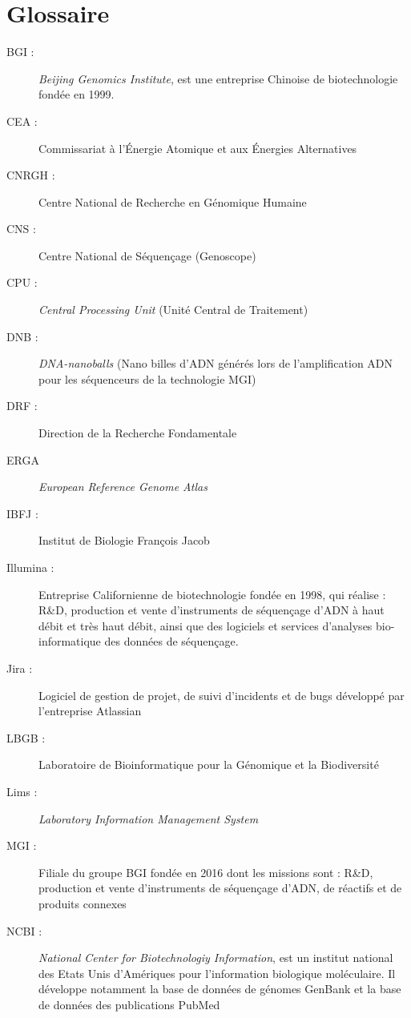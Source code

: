 \section*{Glossaire}

\begin{description}
    \item[BGI : ] \emph{Beijing Genomics Institute}, est une entreprise Chinoise de biotechnologie fondée en 1999.
    \item[CEA :] Commissariat à l'Énergie Atomique et aux Énergies Alternatives
    \item[CNRGH :] Centre National de Recherche en Génomique Humaine 
    \item[CNS :] Centre National de Séquençage (Genoscope)
    \item[CPU :] \emph{Central Processing Unit} (Unité Central de Traitement)
    \item[DNB :] \emph{DNA-nanoballs} (Nano \og billes\fg{} d'ADN générés lors de l'amplification ADN pour les séquenceurs de la technologie MGI)
    \item[DRF :] Direction de la Recherche Fondamentale
    \item[ERGA] \emph{European Reference Genome Atlas}
    \item[IBFJ :] Institut de Biologie François Jacob
    \item[Illumina :] Entreprise Californienne de biotechnologie fondée en 1998, qui réalise : R\&D, production et vente d’instruments de séquençage d’ADN à haut débit et très haut débit, ainsi que des logiciels et services d'analyses bio-informatique des données de séquençage.
    \item[Jira :] Logiciel de gestion de projet, de suivi d'incidents et de bugs développé par l'entreprise Atlassian
    \item[LBGB :] Laboratoire de Bioinformatique pour la Génomique et la Biodiversité
    \item[Lims :] \emph{Laboratory Information Management System}
    \item[MGI : ] Filiale du groupe BGI fondée en 2016 dont les missions sont : R\&D, production et vente d’instruments de séquençage 
    d’ADN, de réactifs et de produits connexes
    \item[NCBI :] \emph{National Center for Biotechnologiy Information}, est un institut national des Etats Unis d'Amériques pour l'information biologique moléculaire. Il développe notamment la base de données de génomes GenBank et la base de données des publications PubMed

\end{description}
